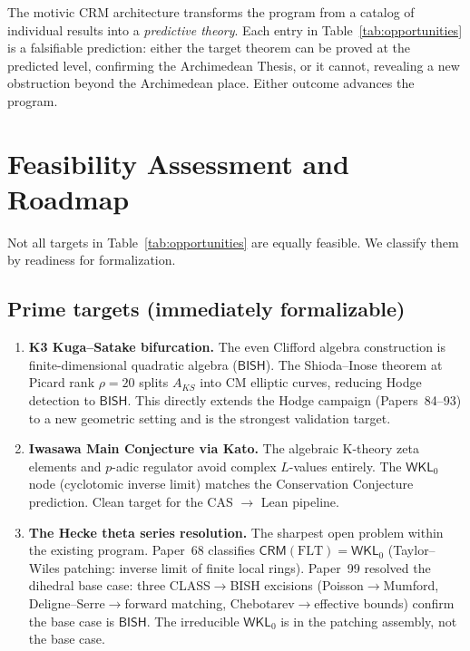 \documentclass[11pt,a4paper]{article}
\theoremstyle{plain}
\theoremstyle{definition}
\newcommand{\BISH}{\textsf{BISH}}
\newcommand{\WKL}{\textsf{WKL}_0}
\newcommand{\CRM}{\textsf{CRM}}
\begin{document}
\medskip
The motivic CRM architecture transforms the program from a catalog of individual results into a \emph{predictive theory}. Each entry in Table~\ref{tab:opportunities} is a falsifiable prediction: either the target theorem can be proved at the predicted level, confirming the Archimedean Thesis, or it cannot, revealing a new obstruction beyond the Archimedean place. Either outcome advances the program.

\section{Feasibility Assessment and Roadmap}\label{app:roadmap}

Not all targets in Table~\ref{tab:opportunities} are equally feasible. We classify them by readiness for formalization.

\subsection{Prime targets (immediately formalizable)}

\begin{enumerate}
\item \textbf{K3 Kuga--Satake bifurcation.} The even Clifford algebra construction is finite-dimensional quadratic algebra ($\BISH$). The Shioda--Inose theorem at Picard rank $\rho = 20$ splits $A_{KS}$ into CM elliptic curves, reducing Hodge detection to $\BISH$. This directly extends the Hodge campaign (Papers~84--93) to a new geometric setting and is the strongest validation target.

\item \textbf{Iwasawa Main Conjecture via Kato.} The algebraic K-theory zeta elements and $p$-adic regulator avoid complex $L$-values entirely. The $\WKL$ node (cyclotomic inverse limit) matches the Conservation Conjecture prediction. Clean target for the CAS $\to$ Lean pipeline.

\item \textbf{The Hecke theta series resolution.} The sharpest open problem within the existing program. Paper~68 classifies $\CRM(\mathrm{FLT}) = \WKL$ (Taylor--Wiles patching: inverse limit of finite local rings). Paper~99 resolved the dihedral base case: three CLASS$\to$BISH excisions (Poisson$\to$Mumford, Deligne--Serre$\to$forward matching, Chebotarev$\to$effective bounds) confirm the base case is $\BISH$. The irreducible $\WKL$ is in the patching assembly, not the base case.
\end{enumerate}
\end{document}
